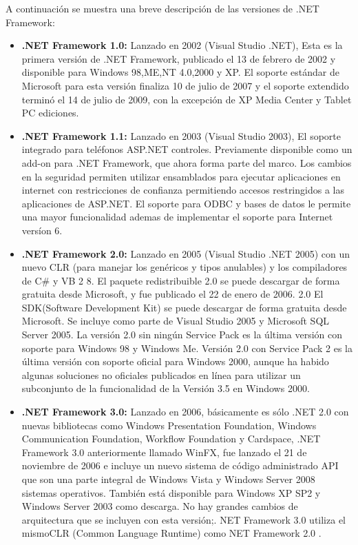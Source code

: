 		A continuaci\'on se muestra una breve descripci\'on de las versiones de .NET Framework:

		\begin{itemize}
			\item \textbf{.NET Framework 1.0: } Lanzado en 2002 (Visual Studio .NET), Esta es la primera versi\'on de .NET Framework, publicado el 13 de febrero de 2002 y disponible para Windows 98,ME,NT 4.0,2000 y XP. El soporte est\'andar de Microsoft para esta versi\'on finaliza 10 de julio de 2007 y el soporte extendido termin\'o el 14 de julio de 2009, con la excepci\'on de XP Media Center y Tablet PC ediciones. 

			\item \textbf{.NET Framework 1.1: } Lanzado en 2003 (Visual Studio 2003), El soporte integrado para tel\'efonos ASP.NET controles. Previamente disponible como un add-on para .NET Framework, que ahora forma parte del marco. Los cambios en la seguridad permiten utilizar ensamblados  para ejecutar aplicaciones en internet con restricciones de confianza permitiendo accesos restringidos  a las aplicaciones de ASP.NET. El soporte para ODBC y bases de datos le permite una mayor funcionalidad ademas de implementar el soporte para Internet vers\'ion  6.

			\item \textbf{.NET Framework 2.0: } Lanzado en 2005 (Visual Studio .NET 2005) con un nuevo CLR (para manejar los gen\'ericos y tipos anulables) y los compiladores de C\# y VB 2 8.
			El paquete redistribuible 2.0 se puede descargar de forma gratuita desde Microsoft, y fue publicado el 22 de enero de 2006. 2.0 El SDK(Software Development Kit) se puede descargar de forma gratuita desde Microsoft. Se incluye como parte de Visual Studio 2005 y Microsoft SQL Server 2005. La versi\'on 2.0 sin ning\'un Service Pack es la \'ultima versi\'on con soporte para Windows 98 y Windows Me. Versi\'on 2.0 con Service Pack 2 es la \'ultima versi\'on con soporte oficial para Windows 2000, aunque ha habido algunas soluciones no oficiales publicados en l\'inea para utilizar un subconjunto de la funcionalidad de la Versi\'on 3.5 en Windows 2000. 

			\item \textbf{.NET Framework 3.0: } Lanzado en 2006, b\'asicamente es s\'olo .NET 2.0 con nuevas bibliotecas como Windows Presentation Foundation, Windows Communication Foundation, Workflow Foundation y Cardspace, .NET Framework 3.0  anteriormente llamado WinFX, fue lanzado el 21 de noviembre de 2006 e incluye un nuevo sistema de c\'odigo administrado API que son una parte integral de Windows Vista y Windows Server 2008 sistemas operativos. Tambi\'en est\'a disponible para Windows XP SP2 y Windows Server 2003 como descarga. No hay grandes cambios de arquitectura que se incluyen con esta versi\'on;. NET Framework 3.0 utiliza el mismoCLR (Common Language Runtime) como NET Framework 2.0 . 


\end{itemize}
